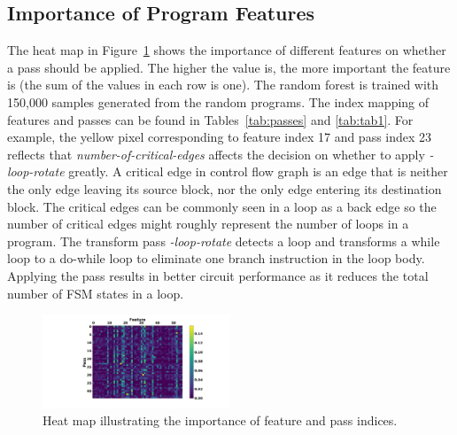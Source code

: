 \subsection{Importance of Program Features}
The heat map in Figure~\ref{fig:heatmap1} shows the importance of different features on whether a pass should be applied. The higher the value is, the more important the feature is (the sum of the values in each row is one).
The random forest is trained with 150,000 samples generated from the random programs. The index mapping of features and passes can be found in Tables~\ref{tab:passes} and \ref{tab:tab1}. For example, the yellow pixel corresponding to feature index 17 and pass index 23 reflects
that \textit{number-of-critical-edges} affects the decision on whether to apply \textit{-loop-rotate} greatly.  A critical edge in control flow graph is an edge that is neither the only edge leaving its source block, nor the only edge entering its destination block. The critical edges can be commonly seen in a loop as a back edge so the number of critical edges might roughly represent the number of loops in a program. The transform pass \textit{-loop-rotate} detects a loop and
transforms a while loop to a do-while loop to eliminate one branch instruction in the loop body. Applying the pass results in better circuit performance as it reduces the total number of FSM states in a loop.  
\begin{figure}[!t]
    \centering
    \includegraphics[trim={9cm 3.5cm 4.2cm 0.8cm},clip,width=0.5\textwidth]{Figures/randforest.png}
    \caption{Heat map illustrating the importance of feature and pass indices.}
    \label{fig:heatmap1}
    \vspace{-0.1cm}
\end{figure}


